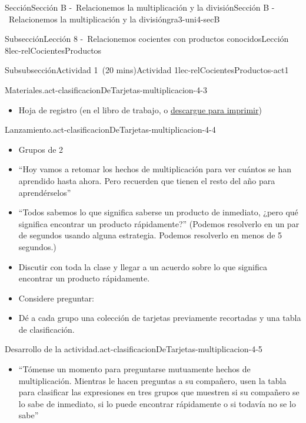 \documentclass[oneside,10pt,]{article}
\newlength{\fillinmaxwidth}
\newlength{\fillincontract}
\newlength{\charmaxwidth}\setlength{\charmaxwidth}{0.5em}
\newlength{\charminwidth}\setlength{\charminwidth}{0.1em}
\newlength{\fillinheight}
\newcommand{\fillintext}[1]{%
\setlength{\fillinmaxwidth}{#1\charmaxwidth}%
\setlength{\fillincontract}{#1\charminwidth}%
\setlength{\fillinheight}{\baselineskip}\addtolength{\fillinheight}{1.2pt}%
\strut\nobreak\leaders\vbox{\hrule width 0.3pt height 0.3pt \vskip -1.2pt}\hskip 1\fillinmaxwidth minus \fillincontract\nobreak\strut%
}
\begin{document}
\begin{sectionptx}{Sección}{Sección B -~Relacionemos la multiplicación y la división}{}{Sección B -~Relacionemos la multiplicación y la división}{}{}{gra3-uni4-secB}
\begin{subsectionptx}{Subsección}{Lección 8 -~Relacionemos cocientes con productos conocidos}{}{Lección 8}{}{}{lec-relCocientesProductos}
\begin{subsubsectionptx}{Subsubsección}{Actividad 1~(20 mins)}{}{Actividad 1}{}{}{lec-relCocientesProductos-act1}
\begin{paragraphs}{Materiales.}{act-clasificacionDeTarjetas-multiplicacion-4-3}
\begin{itemize}[label=\textbullet]
\item{}Hoja de registro (en el libro de trabajo, o \href{external/act-pdf/act-clasificacionDeTarjetas-multiplicacion.pdf}{descargue para imprimir}\footnotemark{})%
\end{itemize}
\end{paragraphs}%
\begin{paragraphs}{Lanzamiento.}{act-clasificacionDeTarjetas-multiplicacion-4-4}%
%
\begin{itemize}[label=\textbullet]
\item{}Grupos de 2%
\item{}``Hoy vamos a retomar los hechos de multiplicación para ver cuántos se han aprendido hasta ahora. Pero recuerden que tienen el resto del año para aprendérselos''%
\item{}``Todos sabemos lo que significa saberse un producto de inmediato, ¿pero qué significa encontrar un producto rápidamente?'' (Podemos resolverlo en un par de segundos usando alguna estrategia. Podemos resolverlo en menos de 5 segundos.)%
\item{}Discutir con toda la clase y llegar a un acuerdo sobre lo que significa encontrar un producto rápidamente.%
\item{}Considere preguntar:%
%
\item{}Dé a cada grupo una colección de tarjetas previamente recortadas y una tabla de clasificación.%
\end{itemize}
\end{paragraphs}%
\begin{paragraphs}{Desarrollo de la actividad.}{act-clasificacionDeTarjetas-multiplicacion-4-5}%
%
\begin{itemize}[label=\textbullet]
\item{}``Tómense un momento para preguntarse mutuamente hechos de multiplicación. Mientras le hacen preguntas a su compañero, usen la tabla para clasificar las expresiones en tres grupos que muestren si su compañero se lo sabe de inmediato, si lo puede encontrar rápidamente o si todavía no se lo sabe''%

\end{itemize}
\end{paragraphs}
\end{subsubsectionptx}
\end{subsectionptx}
\end{sectionptx}
\end{document}
